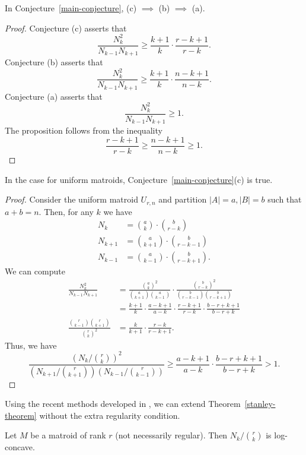 \documentclass[12pt]{article}
\begin{document}
\begin{prop}
	In Conjecture~\ref{main-conjecture}, (c) $\implies$ (b) $\implies$ (a). 
\end{prop}

\begin{proof}
	Conjecture (c) asserts that 
	\[
		\frac{N_k^2}{N_{k-1}N_{k+1}} \geq \frac{k+1}{k} \cdot \frac{r-k+1}{r-k}.
	\]
	Conjecture (b) asserts that
	\[
		\frac{N_k^2}{N_{k-1}N_{k+1}} \geq \frac{k+1}{k} \cdot \frac{n-k+1}{n-k}.
	\]
	Conjecture (a) asserts that 
	\[
		\frac{N_k^2}{N_{k-1}N_{k+1}} \geq 1. 
	\]
	The proposition follows from the inequality 
	\[
		\frac{r-k+1}{r-k} \geq \frac{n-k+1}{n-k} \geq 1.
	\]
\end{proof}

\begin{prop}
	In the case for uniform matroids, Conjecture~\ref{main-conjecture}(c) is true. 
\end{prop}

\begin{proof}
	Consider the uniform matroid $U_{r, n}$ and partition $|A| = a, |B| = b$ such that $a + b = n$. Then, for any $k$ we have
	\begin{align*}
		N_k & = \binom{a}{k} \cdot \binom{b}{r-k} \\
		N_{k+1} & = \binom{a}{k+1} \cdot \binom{b}{r-k-1} \\
		N_{k-1} & = \binom{a}{k-1} \cdot \binom{b}{r-k+1}.
	\end{align*}
	We can compute
	\begin{align*}
		\frac{N_k^2}{N_{k-1} N_{k+1}} & = \frac{\binom{a}{k}^2}{\binom{a}{k+1} \binom{a}{k-1}} \cdot \frac{\binom{b}{r-k}^2}{\binom{b}{r-k-1} \binom{b}{r-k+1}} \\
		& = \frac{k+1}{k} \cdot \frac{a-k+1}{a-k} \cdot \frac{r-k+1}{r-k} \cdot \frac{b-r+k+1}{b-r+k} \\
		\frac{\binom{r}{k-1} \binom{r}{k+1}}{\binom{r}{k}^2} & = \frac{k}{k+1} \cdot \frac{r-k}{r-k+1}.
	\end{align*}
	Thus, we have
	\[
		\frac{(N_k / \binom{r}{k})^2}{(N_{k+1} / \binom{r}{k+1}) (N_{k-1} / \binom{r}{k-1})} \geq \frac{a-k+1}{a-k} \cdot \frac{b-r+k+1}{b-r+k} > 1. 
	\]
\end{proof}

Using the recent methods developed in \cite{lorentzian-polynomials}, we can extend Theorem~\ref{stanley-theorem} without the extra regularity condition. 

\begin{thm} \label{general-theorem}
	Let $M$ be a matroid of rank $r$ (not necessarily regular). Then $N_k / \binom{r}{k}$ is log-concave. 
\end{thm}
\end{document}
